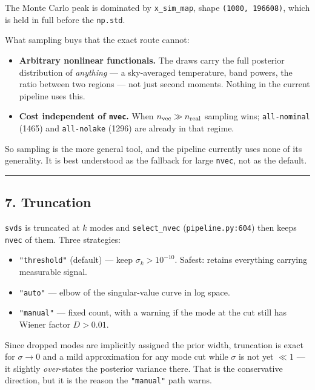\documentclass[
  11pt,
]{article}
\providecommand{\tightlist}{%
  \setlength{\itemsep}{0pt}\setlength{\parskip}{0pt}}
\begin{document}
The Monte Carlo peak is dominated by \texttt{x\_sim\_map}, shape
\texttt{(1000,\ 196608)}, which is held in full before the
\texttt{np.std}.

What sampling buys that the exact route cannot:

\begin{itemize}
\tightlist
\item
  \textbf{Arbitrary nonlinear functionals.} The draws carry the full
  posterior distribution of \emph{anything} --- a sky-averaged
  temperature, band powers, the ratio between two regions --- not just
  second moments. Nothing in the current pipeline uses this.
\item
  \textbf{Cost independent of \texttt{nvec}.} When
  \(n_{\rm vec} \gg n_{\rm real}\) sampling wins; \texttt{all-nominal}
  (1465) and \texttt{all-nolake} (1296) are already in that regime.
\end{itemize}

So sampling is the more general tool, and the pipeline currently uses
none of its generality. It is best understood as the fallback for large
\texttt{nvec}, not as the default.

\begin{center}\rule{0.5\linewidth}{0.5pt}\end{center}

\hypertarget{7-truncation}{%
\subsection{7. Truncation}\label{7-truncation}}

\texttt{svds} is truncated at \(k\) modes and \texttt{select\_nvec}
(\texttt{pipeline.py:604}) then keeps \texttt{nvec} of them. Three
strategies:

\begin{itemize}
\tightlist
\item
  \texttt{"threshold"} (default) --- keep \(\sigma_k > 10^{-10}\).
  Safest: retains everything carrying measurable signal.
\item
  \texttt{"auto"} --- elbow of the singular-value curve in log space.
\item
  \texttt{"manual"} --- fixed count, with a warning if the mode at the
  cut still has Wiener factor \(D > 0.01\).
\end{itemize}

Since dropped modes are implicitly assigned the prior width, truncation
is exact for \(\sigma \to 0\) and a mild approximation for any mode cut
while \(\sigma\) is not yet \(\ll 1\) --- it slightly \emph{over}-states
the posterior variance there. That is the conservative direction, but it
is the reason the \texttt{"manual"} path warns.
\end{document}
